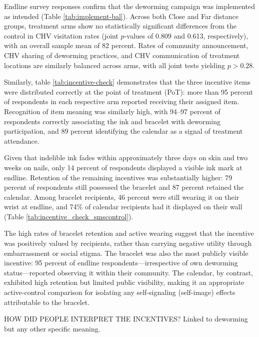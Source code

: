 \documentclass[12pt,a4paper]{article}
\begin{document}



\label{tab:incentive_check_smscontrol}
Endline survey responses confirm that the deworming campaign was implemented as intended
(Table \ref{tab:implement-bal}). Across both Close and Far distance groups, treatment arms
show no statistically significant differences from the control in CHV visitation rates
(joint $p$-values of 0.809 and 0.613, respectively), with an overall sample mean of 82
percent. Rates of community announcement, CHV sharing of deworming practices, and CHV
communication of treatment locations are similarly balanced across arms, with all joint
tests yielding $p > 0.28$.


Similarly, table \ref{tab:incentive-check} demonstrates that the three incentive items were distributed correctly at the point of treatment (PoT): more than 95 percent 
of respondents in each respective arm reported receiving their assigned item. Recognition of 
item meaning was similarly high, with 94–97 percent of respondents correctly associating the 
ink and bracelet with deworming participation, and 89 percent identifying the calendar 
as a signal of treatment attendance.

Given that indelible ink fades within approximately three days on skin and two weeks on nails, 
only 14 percent of respondents displayed a visible ink mark at endline. Retention of the 
remaining incentives was substantially higher: 79 percent of respondents still possessed the 
bracelet and 87 percent retained the calendar. Among bracelet recipients, 46 percent were still 
wearing it on their wrist at endline, and 74\% of calendar recipients had it displayed on their 
wall (Table \ref{tab:incentive_check_smscontrol}).

The high rates of bracelet retention and active wearing suggest that the incentive was 
positively valued by recipients, rather than carrying negative utility through embarrassment 
or social stigma. The bracelet was also the most publicly visible incentive: 95 percent of 
endline respondents—irrespective of own deworming status—reported observing it within their 
community. The calendar, by contrast, exhibited high retention but limited public visibility, 
making it an appropriate active-control comparison for isolating any self-signaling 
(self-image) effects attributable to the bracelet.


HOW DID PEOPLE INTERPRET THE INCENTIVES? Linked to deworming but any other specific meaning. 
\end{document}

